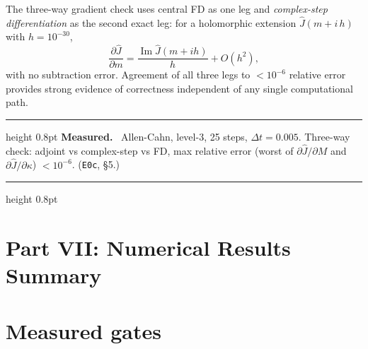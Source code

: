 \documentclass[11pt]{article}
\newenvironment{measured}{%
  \par\medskip\noindent\begin{minipage}{\linewidth}
  \hrule height 0.8pt \smallskip
  \textbf{Measured.}\ }{%
  \smallskip\hrule height 0.8pt \end{minipage}\par\medskip}
\begin{document}
The three-way gradient check uses central FD as one leg and
\emph{complex-step differentiation} as the second exact leg: for a
holomorphic extension $\hat{J}(m + i\,h)$ with $h = 10^{-30}$,
\begin{equation}
  \frac{\partial \hat{J}}{\partial m} = \frac{\operatorname{Im}
  \hat{J}(m + ih)}{h} + O(h^2) ,
  \label{eq:cstep}
\end{equation}
with no subtraction error.  Agreement of all three legs to
$< 10^{-6}$ relative error provides strong evidence of correctness
independent of any single computational path.

\begin{measured}
Allen-Cahn, level-3, 25 steps, $\Delta t = 0.005$.  Three-way check:
adjoint vs complex-step vs FD, max relative error (worst of $\partial
\hat{J}/\partial M$ and $\partial \hat{J}/\partial \kappa$) $< 10^{-6}$.
(\texttt{E0c}, \S5.)
\end{measured}

\section*{Part VII: Numerical Results Summary}

\section{Measured gates}
\label{sec:gates}
\end{document}
